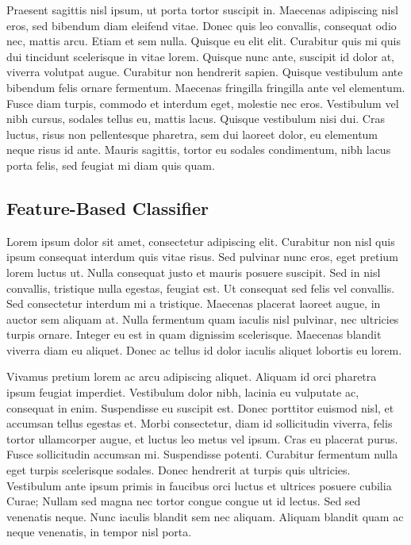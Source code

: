\documentclass[preprint,5p,times,twocolumn]{elsarticle}
\begin{document}
Praesent sagittis nisl ipsum, ut porta tortor suscipit in. Maecenas adipiscing
nisl eros, sed bibendum diam eleifend vitae. Donec quis leo convallis,
consequat odio nec, mattis arcu. Etiam et sem nulla. Quisque eu elit elit.
Curabitur quis mi quis dui tincidunt scelerisque in vitae lorem. Quisque nunc
ante, suscipit id dolor at, viverra volutpat augue. Curabitur non hendrerit
sapien. Quisque vestibulum ante bibendum felis ornare fermentum. Maecenas
fringilla fringilla ante vel elementum. Fusce diam turpis, commodo et interdum
eget, molestie nec eros. Vestibulum vel nibh cursus, sodales tellus eu, mattis
lacus. Quisque vestibulum nisi dui. Cras luctus, risus non pellentesque
pharetra, sem dui laoreet dolor, eu elementum neque risus id ante. Mauris
sagittis, tortor eu sodales condimentum, nibh lacus porta felis, sed feugiat mi
diam quis quam.

\subsection{Feature-Based Classifier}
\label{results:featurebased}

Lorem ipsum dolor sit amet, consectetur adipiscing elit. Curabitur non nisl
quis ipsum consequat interdum quis vitae risus. Sed pulvinar nunc eros, eget
pretium lorem luctus ut. Nulla consequat justo et mauris posuere suscipit. Sed
in nisl convallis, tristique nulla egestas, feugiat est. Ut consequat sed felis
vel convallis. Sed consectetur interdum mi a tristique. Maecenas placerat
laoreet augue, in auctor sem aliquam at. Nulla fermentum quam iaculis nisl
pulvinar, nec ultricies turpis ornare. Integer eu est in quam dignissim
scelerisque. Maecenas blandit viverra diam eu aliquet. Donec ac tellus id dolor
iaculis aliquet lobortis eu lorem.

Vivamus pretium lorem ac arcu adipiscing aliquet. Aliquam id orci pharetra
ipsum feugiat imperdiet. Vestibulum dolor nibh, lacinia eu vulputate ac,
consequat in enim. Suspendisse eu suscipit est. Donec porttitor euismod nisl,
et accumsan tellus egestas et. Morbi consectetur, diam id sollicitudin viverra,
felis tortor ullamcorper augue, et luctus leo metus vel ipsum. Cras eu placerat
purus. Fusce sollicitudin accumsan mi. Suspendisse potenti. Curabitur fermentum
nulla eget turpis scelerisque sodales. Donec hendrerit at turpis quis
ultricies. Vestibulum ante ipsum primis in faucibus orci luctus et ultrices
posuere cubilia Curae; Nullam sed magna nec tortor congue congue ut id lectus.
Sed sed venenatis neque. Nunc iaculis blandit sem nec aliquam. Aliquam blandit
quam ac neque venenatis, in tempor nisl porta.
\end{document}
